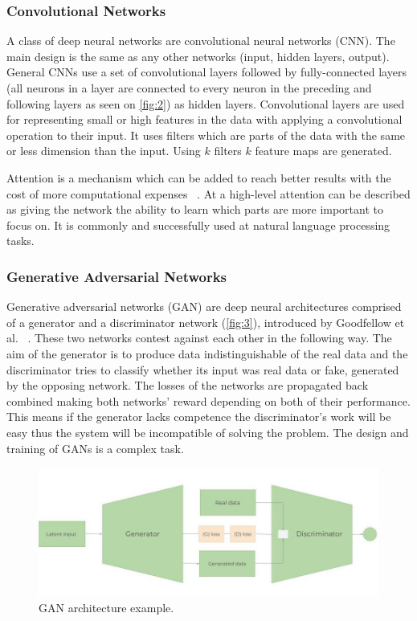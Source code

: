 \documentclass[11pt,a4paper,oneside]{article}
\begin{document}
  \subsubsection{Convolutional Networks}
  \label{sec:conv_nets}

  A class of deep neural networks are convolutional neural networks (CNN). The main design is the same as any other 
  networks (input, hidden layers, output). General CNNs use a set of convolutional layers followed by fully-connected 
  layers (all neurons in a layer are connected to every neuron in the preceding and following layers as seen on 
  \autoref{fig:2}) as hidden layers. Convolutional layers are used for representing small or high features in the data 
  with applying a convolutional operation to their input. It uses filters which are parts of the data with the same or 
  less dimension than the input. Using $k$ filters $k$ feature maps are generated.
  
  Attention is a mechanism which can be added to reach better results with the cost of more computational expenses 
  ~\cite{attention}. At a high-level attention can be described as giving the network the ability to learn which parts 
  are more important to focus on. It is commonly and successfully used at natural language processing tasks.

  \subsubsection{Generative Adversarial Networks}
  \label{sec:gans}

  Generative adversarial networks (GAN) are deep neural architectures comprised of a generator and a discriminator 
  network (\autoref{fig:3}), introduced by Goodfellow et al. ~\cite{gan}. These two networks contest against each other 
  in the following way. The aim of the generator is to produce data indistinguishable of the real data and the 
  discriminator tries to classify whether its input was real data or fake, generated by the opposing network. The losses 
  of the networks are propagated back combined making both networks’ reward depending on both of their performance. This 
  means if the generator lacks competence the discriminator’s work will be easy thus the system will be incompatible of 
  solving the problem. The design and training of GANs is a complex task.

  \begin{figure}[tbh]
    \centering
    \includegraphics[width=12cm]{gan.jpg}
    \caption{GAN architecture example.}
    \label{fig:3}
  \end{figure}
\end{document}
